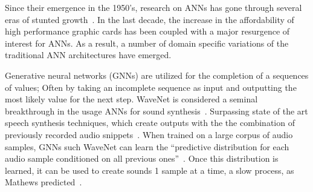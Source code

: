 \documentclass[\main/thesis.tex]{subfiles}
\begin{document}
Since their emergence in the 1950's, research on ANNs has gone through several eras of stunted growth~\cite{basheer2000artificial,anderson1988neurocomputing}.  In the last decade, the increase in the affordability of high performance graphic cards has been coupled with a major resurgence of interest for ANNs. As a result, a number of domain specific variations of the traditional ANN architectures have emerged. 

Generative neural networks (GNNs) are utilized for the completion of a sequences of values; Often by taking an incomplete sequence as input and outputting the most likely value for the next step. WaveNet is considered a seminal breakthrough in the usage ANNs for sound synthesis~\cite{oord2016wavenet}. Surpassing state of the art speech synthesis techniques, which create outputs with the the combination of previously recorded audio snippets~\cite{schwarz2007corpus}. When trained on a large corpus of audio samples, GNNs such WaveNet can learn the \enquote{predictive distribution for each
audio sample conditioned on all previous ones}~\cite{oord2016wavenet}. Once this distribution is learned, it can be used to create sounds 1 sample at a time, a slow process, as Mathews predicted~\cite{mathews1963digital}. \\
\end{document}
